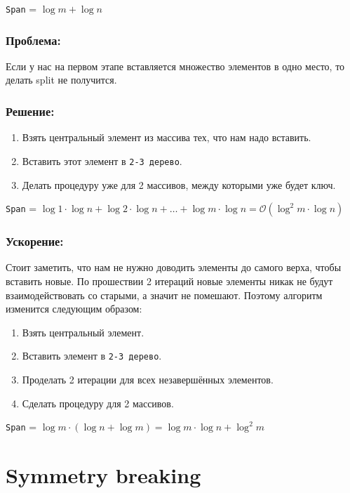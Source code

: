 \documentclass[11pt]{article}
\begin{document}
    \texttt{Span} = $\log{m} + \log{n}$
    
    \subsubsection*{Проблема:}

    Если у нас на первом этапе вставляется множество элементов в одно место, то делать split не получится.


    \subsubsection*{Решение:}

    \begin{enumerate}
        \item Взять центральный элемент из массива тех, что нам надо вставить.
        \item Вставить этот элемент в \texttt{2-3 дерево}.
        \item Делать процедуру уже для 2 массивов, между которыми уже будет ключ.
    \end{enumerate}

    \texttt{Span} = $\log{1} \cdot \log{n} + \log{2} \cdot \log{n} + \dots + \log{m} \cdot \log{n} = \mathcal{O}(\log^2{m} \cdot \log{n})$
    
    \subsubsection*{Ускорение:}

    Стоит заметить, что нам не нужно доводить элементы до самого верха, чтобы вставить новые.
    По прошествии 2 итераций новые элементы никак не будут взаимодействовать со старыми, а значит не помешают.
    Поэтому алгоритм изменится следующим образом:

    \begin{enumerate}
        \item Взять центральный элемент.
        \item Вставить элемент в \texttt{2-3 дерево}.
        \item Проделать 2 итерации для всех незавершённых элементов.
        \item Сделать процедуру для 2 массивов.
    \end{enumerate}

    \texttt{Span} = $\log{m} \cdot (\log{n} + \log{m}) = \log{m} \cdot \log{n} + \log^2{m}$

    \section*{Symmetry breaking}
\end{document}
